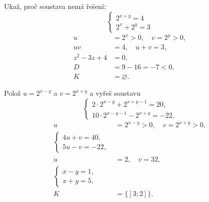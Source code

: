 \documentclass[11pt,a4paper]{article}
\begin{document}
\begin{prikladReseniBox}[title={Příklad 4}]
Ukaž, proč soustava nemá řešení: \[
\begin{cases}2^{x+y}=4\\2^x+2^y=3\end{cases}
\]
\tcblower
\[
\begin{aligned}u&=2^x>0,\quad v=2^y>0,\\uv&=4,\quad u+v=3,\\z^2-3z+4&=0,\\D&=9-16=-7<0,\\K&=\varnothing.\end{aligned}
\]

\end{prikladReseniBox}
\begin{prikladReseniBox}[title={Příklad 5}]
Polož $u=2^{x-y}$ a $v=2^{x+y}$ a vyřeš soustavu
\[
\begin{cases}
2\cdot2^{x-y}+2^{x+y-1}=20,\\
10\cdot2^{x-y-1}-2^{x+y}=-22.
\end{cases}
\]
\tcblower
\[
\begin{aligned}u&=2^{x-y}>0,\quad v=2^{x+y}>0,\\\begin{cases}4u+v=40,\\5u-v=-22,\end{cases}\\u&=2,\quad v=32,\\\begin{cases}x-y=1,\\x+y=5,\end{cases}\\K&=\{[3;2]\}.\end{aligned}\]
\end{prikladReseniBox}
\end{document}
